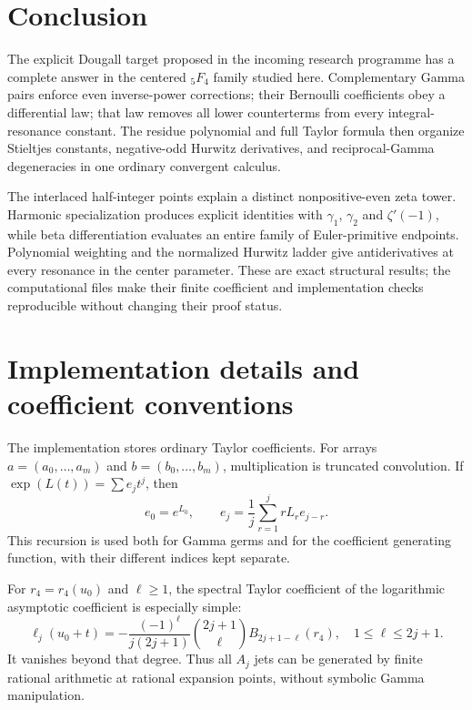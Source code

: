 \documentclass[11pt,letterpaper]{article}
\numberwithin{equation}{section}
\theoremstyle{definition}
\theoremstyle{remark}
\begin{document}
\section{Conclusion}

The explicit Dougall target proposed in the incoming research programme
has a complete answer in the centered ${}_5F_4$ family studied here.
Complementary Gamma pairs enforce even inverse-power corrections; their
Bernoulli coefficients obey a differential law; that law removes all
lower counterterms from every integral-resonance constant. The residue
polynomial and full Taylor formula then organize Stieltjes constants,
negative-odd Hurwitz derivatives, and reciprocal-Gamma degeneracies in one
ordinary convergent calculus.

The interlaced half-integer points explain a distinct nonpositive-even
zeta tower. Harmonic specialization produces explicit identities with
$\gamma_1$, $\gamma_2$ and $\zeta'(-1)$, while beta differentiation
evaluates an entire family of Euler-primitive endpoints. Polynomial
weighting and the normalized Hurwitz ladder give antiderivatives at every
resonance in the center parameter. These are exact structural results;
the computational files make their finite coefficient and implementation
checks reproducible without changing their proof status.

\appendix
\section{Implementation details and coefficient conventions}
\label{dr:app:implementation}

The implementation stores ordinary Taylor coefficients. For arrays
$a=(a_0,\ldots,a_m)$ and $b=(b_0,\ldots,b_m)$, multiplication is truncated
convolution. If $\exp(L(t))=\sum e_jt^j$, then
\begin{equation}
 e_0=e^{L_0},\qquad
 e_j=\frac1j\sum_{r=1}^j rL_re_{j-r}.
 \label{dr:eq:expjet}
\end{equation}
This recursion is used both for Gamma germs and for the coefficient
generating function, with their different indices kept separate.

For $r_4=r_4(u_0)$ and $\ell\geq1$, the spectral Taylor coefficient
of the logarithmic asymptotic coefficient is especially simple:
\begin{equation}
 [t^\ell]\ell_j(u_0+t)=
 -\frac{(-1)^\ell}{j(2j+1)}
 \binom{2j+1}{\ell}B_{2j+1-\ell}(r_4),
 \quad 1\leq\ell\leq2j+1.
 \label{dr:eq:ell-jet}
\end{equation}
It vanishes beyond that degree. Thus all $A_j$ jets can be generated by
finite rational arithmetic at rational expansion points, without symbolic
Gamma manipulation.
\end{document}
